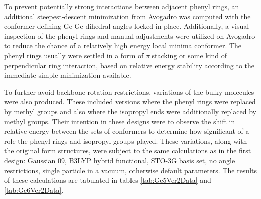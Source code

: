 To prevent potentially strong interactions between adjacent phenyl rings, an additional steepest-descent minimization from Avogadro was computed with the conformer-defining Ge-Ge dihedral angles locked in place. 
Additionally, a visual inspection of the phenyl rings and manual adjustments were utilized on Avogadro to reduce the chance of a relatively high energy local minima conformer. 
The phenyl rings usually were settled in a form of $\pi$ stacking or some kind of perpendicular ring interaction, based on relative energy stability according to the immediate simple minimization available. 

To further avoid backbone rotation restrictions, variations of the bulky molecules were also produced. 
These included versions where the phenyl rings were replaced by methyl groups and also where the isopropyl ends were additionally replaced by methyl groups. 
Their intention in these designs were to observe the shift in relative energy between the sets of conformers to determine how significant of a role the phenyl rings and isopropyl groups played.
These variations, along with the original form structures, were subject to the same calculations as in the first design: Gaussian 09, B3LYP hybrid functional, STO-3G basis set, no angle restrictions, single particle in a vacuum, otherwise default parameters.
The results of these calculations are tabulated in tables \ref{tab:Ge5Ver2Data} and \ref{tab:Ge6Ver2Data}.

